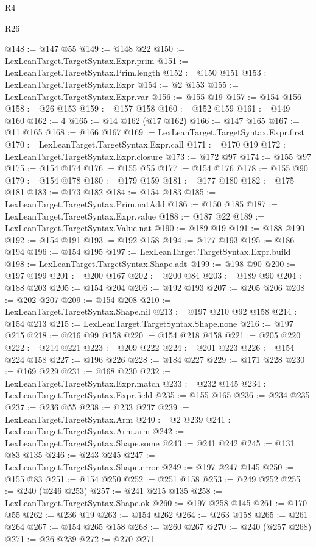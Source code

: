\begin{lexlean}{R4}
\begin{lexlean}{R26}
\begin{coremodule}
{{{{{{{{{{{{{{{{{{{{{{{{{{{{{{{{{{{{{{{{{{{{{{{{{{{{{{{{{{{{{{{{{{{{{{{{@148 := @147 @55
@149 := @148 @22
@150 := LexLeanTarget.TargetSyntax.Expr.prim
@151 := LexLeanTarget.TargetSyntax.Prim.length
@152 := @150 @151
@153 := LexLeanTarget.TargetSyntax.Expr
@154 := @2 @153
@155 := LexLeanTarget.TargetSyntax.Expr.var
@156 := @155 @19
@157 := @154 @156
@158 := @26 @153
@159 := @157 @158
@160 := @152 @159
@161 := @149 @160
@162 := 4
@165 := @14 @162 (@17 @162)
@166 := @147 @165
@167 := @11 @165
@168 := @166 @167
@169 := LexLeanTarget.TargetSyntax.Expr.first
@170 := LexLeanTarget.TargetSyntax.Expr.call
@171 := @170 @19
@172 := LexLeanTarget.TargetSyntax.Expr.closure
@173 := @172 @97
@174 := @155 @97
@175 := @154 @174
@176 := @155 @55
@177 := @154 @176
@178 := @155 @90
@179 := @154 @178
@180 := @179 @159
@181 := @177 @180
@182 := @175 @181
@183 := @173 @182
@184 := @154 @183
@185 := LexLeanTarget.TargetSyntax.Prim.natAdd
@186 := @150 @185
@187 := LexLeanTarget.TargetSyntax.Expr.value
@188 := @187 @22
@189 := LexLeanTarget.TargetSyntax.Value.nat
@190 := @189 @19
@191 := @188 @190
@192 := @154 @191
@193 := @192 @158
@194 := @177 @193
@195 := @186 @194
@196 := @154 @195
@197 := LexLeanTarget.TargetSyntax.Expr.build
@198 := LexLeanTarget.TargetSyntax.Shape.adt
@199 := @198 @90
@200 := @197 @199
@201 := @200 @167
@202 := @200 @84
@203 := @189 @90
@204 := @188 @203
@205 := @154 @204
@206 := @192 @193
@207 := @205 @206
@208 := @202 @207
@209 := @154 @208
@210 := LexLeanTarget.TargetSyntax.Shape.nil
@213 := @197 @210 @92 @158
@214 := @154 @213
@215 := LexLeanTarget.TargetSyntax.Shape.none
@216 := @197 @215
@218 := @216 @99 @158
@220 := @154 @218 @158
@221 := @205 @220
@222 := @214 @221
@223 := @209 @222
@224 := @201 @223
@226 := @154 @224 @158
@227 := @196 @226
@228 := @184 @227
@229 := @171 @228
@230 := @169 @229
@231 := @168 @230
@232 := LexLeanTarget.TargetSyntax.Expr.match
@233 := @232 @145
@234 := LexLeanTarget.TargetSyntax.Expr.field
@235 := @155 @165
@236 := @234 @235
@237 := @236 @55
@238 := @233 @237
@239 := LexLeanTarget.TargetSyntax.Arm
@240 := @2 @239
@241 := LexLeanTarget.TargetSyntax.Arm.arm
@242 := LexLeanTarget.TargetSyntax.Shape.some
@243 := @241 @242
@245 := @131 @83 @135
@246 := @243 @245
@247 := LexLeanTarget.TargetSyntax.Shape.error
@249 := @197 @247 @145
@250 := @155 @83
@251 := @154 @250
@252 := @251 @158
@253 := @249 @252
@255 := @240 (@246 @253)
@257 := @241 @215 @135
@258 := LexLeanTarget.TargetSyntax.Shape.ok
@260 := @197 @258 @145
@261 := @170 @55
@262 := @236 @19
@263 := @154 @262
@264 := @263 @158
@265 := @261 @264
@267 := @154 @265 @158
@268 := @260 @267
@270 := @240 (@257 @268)
@271 := @26 @239
@272 := @270 @271
}}}}}}}}}}}}}}}}}}}}}}}}}}}}}}}}}}}}}}}}}}}}}}}}}}}}}}}}}}}}}}}}}}}}}}}}
\end{coremodule}
\end{lexlean}
\end{lexlean}

